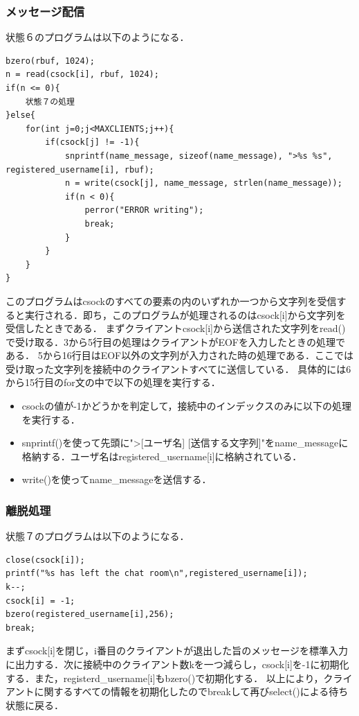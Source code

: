 \documentclass[dvipdfmx]{jarticle}
\begin{document}
\subsubsection{メッセージ配信}
状態６のプログラムは以下のようになる．
\begin{lstlisting}
bzero(rbuf, 1024);
n = read(csock[i], rbuf, 1024);
if(n <= 0){
    状態７の処理
}else{
    for(int j=0;j<MAXCLIENTS;j++){
        if(csock[j] != -1){
            snprintf(name_message, sizeof(name_message), ">%s %s", registered_username[i], rbuf);
            n = write(csock[j], name_message, strlen(name_message));
            if(n < 0){
                perror("ERROR writing");
                break;
            }
        }
    }
}
\end{lstlisting}
このプログラムはcsockのすべての要素の内のいずれか一つから文字列を受信すると実行される．即ち，このプログラムが処理されるのはcsock[i]から文字列を受信したときである．
まずクライアントcsock[i]から送信された文字列をread()で受け取る．3から5行目の処理はクライアントがEOFを入力したときの処理である．
5から16行目はEOF以外の文字列が入力された時の処理である．ここでは受け取った文字列を接続中のクライアントすべてに送信している．
具体的には6から15行目のfor文の中で以下の処理を実行する．
\begin{itemize}
    \item csockの値が-1かどうかを判定して，接続中のインデックスのみに以下の処理を実行する．
    \item snprintf()を使って先頭に">[ユーザ名] [送信する文字列]"をname\_messageに格納する．ユーザ名はregistered\_username[i]に格納されている．
    \item write()を使ってname\_messageを送信する．
\end{itemize}
\subsubsection{離脱処理}
状態７のプログラムは以下のようになる．
\begin{lstlisting}
close(csock[i]);
printf("%s has left the chat room\n",registered_username[i]);
k--;
csock[i] = -1;
bzero(registered_username[i],256);
break;
\end{lstlisting}
まずcsock[i]を閉じ，i番目のクライアントが退出した旨のメッセージを標準入力に出力する．次に接続中のクライアント数kを一つ減らし，csock[i]を-1に初期化する．また，registerd\_username[i]もbzero()で初期化する．
以上により，クライアントに関するすべての情報を初期化したのでbreakして再びselect()による待ち状態に戻る．
\end{document}
